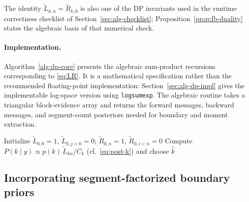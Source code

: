 The identity $\widetilde L_{k,n}=\widetilde R_{k,0}$ is also one of the DP invariants used in the
runtime correctness checklist of Section~\ref{sec:alg-checklist}; Proposition~\ref{prop:fb-duality}
states the algebraic basis of that numerical check.

\paragraph{Implementation.}
Algorithm~\ref{alg:dp-core} presents the algebraic sum-product recursions corresponding to
\eqref{eq:LR}. It is a mathematical specification rather than the recommended floating-point
implementation: Section~\ref{sec:alg-dp-impl} gives the implementable log-space version using
\texttt{logsumexp}. The algebraic routine takes a triangular block-evidence array and returns the
forward messages, backward messages, and segment-count posteriors needed for boundary and moment
extraction.

\begin{algorithm}[H]
\caption{Generic algebraic DP for EF segmentation (prefix/suffix form)}
\label{alg:dp-core}
Initialize $\widetilde{L}_{0,0}=1$, $\widetilde{L}_{0,j>0}=0$; $\widetilde{R}_{0,n}=1$, $\widetilde{R}_{0,i<n}=0$\;
Compute $P(k\mid y)\propto p(k)\,\widetilde{L}_{k n}/C_k$ (cf.\ \eqref{eq:post-k}) and choose $\widehat{k}$\;
\end{algorithm}

\subsection{Incorporating segment-factorized boundary priors}
\label{subsec:priorinc}

